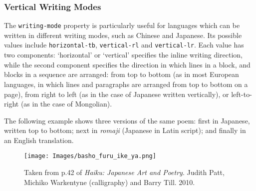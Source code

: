\subsubsection[{Vertical Writing Modes}]{Vertical Writing Modes}\label{WDWMEG1}\par
The \texttt{writing-mode} property is particularly useful for languages which can be written in different writing modes, such as Chinese and Japanese. Its possible values include \texttt{horizontal-tb}, \texttt{vertical-rl} and \texttt{vertical-lr}. Each value has two components: ‘horizontal’ or ‘vertical’ specifies the inline writing direction, while the second component specifies the direction in which lines in a block, and blocks in a sequence are arranged: from top to bottom (as in most European languages, in which lines and paragraphs are arranged from top to bottom on a page), from right to left (as in the case of Japanese written vertically), or left-to-right (as in the case of Mongolian).\par
The following example shows three versions of the same poem: first in Japanese, written top to bottom; next in \textit{romaji} (Japanese in Latin script); and finally in an English translation.\par
\begin{figure}[htbp]
\noindent\noindent\texttt{[image: Images/basho\_furu\_ike\_ya.png]}
\caption{Taken from p.42 of \textit{Haiku: Japanese Art and Poetry}. Judith Patt, Michiko Warkentyne (calligraphy) and Barry Till. 2010.}\end{figure}
\par
\par
